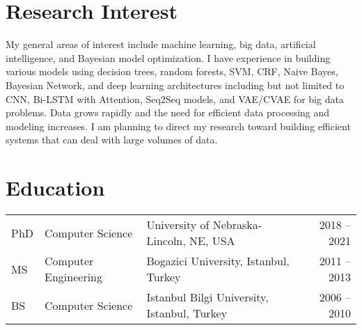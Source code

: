\documentclass[a4paper,10pt]{article}
\begin{document}
\maketitle

\section{Research Interest}
My general areas of interest include machine learning, big data, artificial
intelligence, and Bayesian model optimization. I have experience in
building various models using decision trees, random forests, SVM, CRF, Naive
Bayes, Bayesian Network, and deep learning architectures including but not
limited to CNN, Bi-LSTM with Attention, Seq2Seq models, and VAE/CVAE for big
data problems. Data grows rapidly and the need for efficient data processing
and modeling increases. I am planning to direct my research toward building
efficient systems that can deal with large volumes of data.
\vspace{0.5cm}

\section{Education}
\vspace{0.3cm}
\begin{tabular}{p{1cm}p{4cm}p{7cm}r}
PhD & Computer Science & University of Nebraska-Lincoln, NE, USA & 2018 -- 2021\\
MS & Computer Engineering & Bogazici University, Istanbul, Turkey & 2011 -- 2013\\
BS & Computer Science & Istanbul Bilgi University, Istanbul, Turkey & 2006 -- 2010
\end{tabular}
\vspace{0.5cm}
\end{document}
